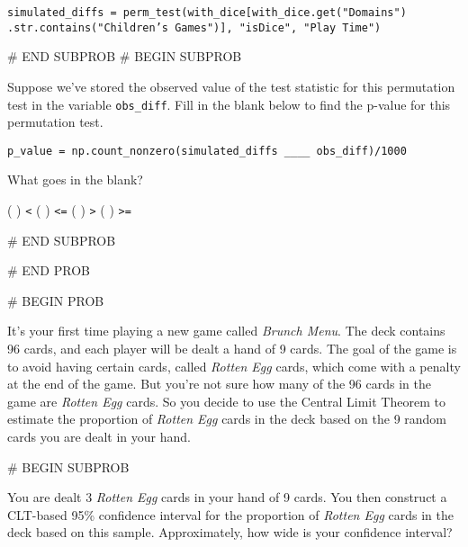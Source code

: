 \documentclass[twoside,12pt]{article}
\begin{document}
{        \begin{responsebox}{2in}
            \texttt{simulated\_diffs = perm\_test(with\_dice[with\_dice.get("Domains")
            .str.contains("Children's Games")], "isDice", "Play Time")}
        \end{responsebox}
    

# END SUBPROB
    # BEGIN SUBPROB


        Suppose we've stored the observed value of the test statistic for this permutation test in the variable \texttt{obs\_diff}. Fill in the blank below to find the p-value for this permutation test.

\begin{verbatim}
p_value = np.count_nonzero(simulated_diffs ____ obs_diff)/1000
\end{verbatim}

        What goes in the blank? 

        \begin{center}
            ( ) \texttt{<}         
            ( ) \texttt{<=}        
            ( ) \texttt{>}        
            ( ) \texttt{>=}
        \end{center}
        
    

# END SUBPROB




# END PROB

\newpage
# BEGIN PROB



It's your first time playing a new game called \textit{Brunch Menu}. The deck contains 96 cards, and each player will be dealt a hand of 9 cards. The goal of the game is to avoid having certain cards, called \textit{Rotten Egg} cards, which come with a penalty at the end of the game. But you're not sure how many of the 96 cards in the game are \textit{Rotten Egg} cards. So you decide to use the Central Limit Theorem to estimate the proportion of \textit{Rotten Egg} cards in the deck based on the 9 random cards you are dealt in your hand.


    # BEGIN SUBPROB


        You are dealt 3 \textit{Rotten Egg} cards in your hand of 9 cards. You then construct a CLT-based 95\% confidence interval for the proportion of \textit{Rotten Egg} cards in the deck based on this sample. Approximately, how wide is your confidence interval? 

        \vspace{0.1in}

}
\end{document}

